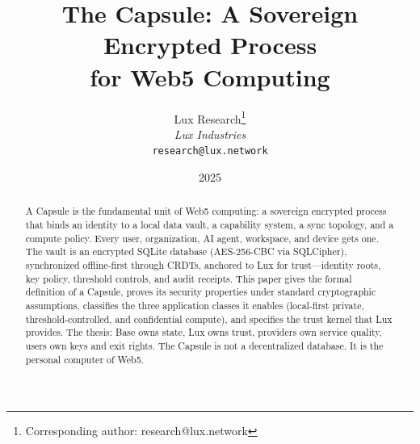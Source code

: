 \documentclass[11pt,a4paper]{article}
\title{\textbf{The Capsule: A Sovereign Encrypted Process\\for Web5 Computing}}
\author{
Lux Research\thanks{Corresponding author: research@lux.network}\\
\textit{Lux Industries}\\
\texttt{research@lux.network}
}
\date{2025}
\begin{document}
\luxcoverpage

\begin{abstract}
A Capsule is the fundamental unit of Web5 computing: a sovereign encrypted process
that binds an identity to a local data vault, a capability system, a sync topology,
and a compute policy. Every user, organization, AI agent, workspace, and device
gets one. The vault is an encrypted SQLite database (AES-256-CBC via SQLCipher),
synchronized offline-first through CRDTs, anchored to Lux for trust---identity
roots, key policy, threshold controls, and audit receipts. This paper gives the
formal definition of a Capsule, proves its security properties under standard
cryptographic assumptions, classifies the three application classes it enables
(local-first private, threshold-controlled, and confidential compute), and
specifies the trust kernel that Lux provides. The thesis: Base owns state, Lux
owns trust, providers own service quality, users own keys and exit rights. The
Capsule is not a decentralized database. It is the personal computer of Web5.
\end{abstract}














\end{document}
